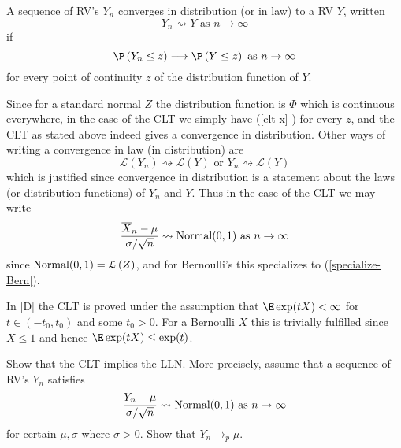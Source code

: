 \begin{definition}
\label{def-converg-in-law} A sequence of RV's $Y_{n}$ converges in
distribution (or in law) to a RV $Y$, written 
\begin{equation*}
Y_{n}\rightsquigarrow Y\text{ as }n\rightarrow \infty
\end{equation*}%
if 
\begin{equation}
\P \left( Y_{n}\leq z\right) \longrightarrow \P \left( Y\leq z\right) 
\text{ as }n\rightarrow \infty  \label{clt-x}
\end{equation}%
for every point of continuity $z$ of the distribution function of $Y$.
\end{definition}

Since for a standard normal $Z$ the distribution function is $\Phi $ which
is continuous everywhere, in the case of the CLT we simply have (\ref{clt-x}%
) for every $z$, and the CLT as stated above indeed gives a convergence in
distribution. Other ways of writing a convergence in law (in distribution)
are 
\begin{equation*}
\mathcal{L}\left( Y_{n}\right) \rightsquigarrow \mathcal{L}\left( Y\right) 
\text{ or }Y_{n}\rightsquigarrow \mathcal{L}\left( Y\right)
\end{equation*}%
which is justified since convergence in distribution is a statement about
the laws (or distribution functions) of $Y_{n}$ and $Y$. Thus in the case of
the CLT we may write 
\begin{equation*}
\frac{\overline{X}_{n}-\mu }{\sigma /\sqrt{n}}\rightsquigarrow \normal(0,1)\text{ as }%
n\rightarrow \infty
\end{equation*}%
since $\mbox{{\rm Normal}}(0,1)=\mathcal{L}\left( Z\right) $, and for Bernoulli's this
specializes to (\ref{specialize-Bern}).

In [D] the CLT is proved under the assumption that $\E\exp (tX)<\infty $ for $%
t\in \left( -t_{0},t_{0}\right) $ and some $t_{0}>0$. For a Bernoulli $X$
this is trivially fulfilled since $X\leq 1$ and hence $\E\exp (tX)\leq \exp
(t)$. \bigskip

\begin{Exercise}[title={CLT implies LLN},label={CLTImpliesLLN}]
Show that the CLT implies the LLN. More precisely, assume
that a sequence of RV's $Y_{n}$ satisfies 
\begin{equation*}
\frac{Y_{n}-\mu }{\sigma /\sqrt{n}}\rightsquigarrow \normal(0,1)\text{ as }%
n\rightarrow \infty
\end{equation*}%
for certain $\mu ,\sigma $ where $\sigma >0$. Show that $Y_{n}%
\longrightarrow _{p}\mu $. \bigskip \bigskip
\end{Exercise}

